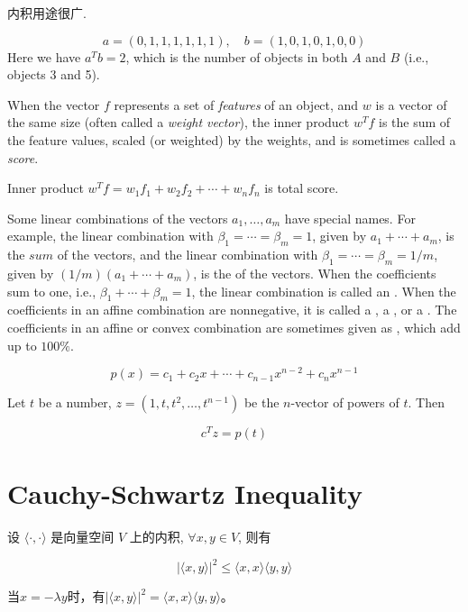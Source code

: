内积用途很广.

\begin{example}[计算同时出现的项目数]
   $$
a=(0,1,1,1,1,1,1), \quad b=(1,0,1,0,1,0,0)
$$
Here we have $ a^{T} b=2 $, which is the number of objects in both $ A $ and $ B $ (i.e., objects 3 and 5). 
\end{example}

\begin{example}
    When the vector $f$ represents a set of \textit{features} of
    an object, and $w$ is a vector of the same size (often called a \textit{weight vector}), the
    inner product $w^T f$ is the sum of the feature values, scaled (or weighted) by
    the weights, and is sometimes called a \textit{score}.

    Inner product $ w^{T} f=w_{1} f_{1}+w_{2} f_{2}+\cdots+w_{n} f_{n} $ is total score. 

    Some linear combinations of the vectors $ a_{1}, \ldots, a_{m} $ have special names. For example, the linear combination with $ \beta_{1}=\cdots=\beta_{m}=1 $, given by $ a_{1}+\cdots+a_{m} $, is the $ s u m $ of the vectors, and the linear combination with $ \beta_{1}=\cdots=\beta_{m}=1 / m $, given by $ (1 / m)\left(a_{1}+\cdots+a_{m}\right) $, is the  of the vectors. When the coefficients sum to one, i.e., $ \beta_{1}+\cdots+\beta_{m}=1 $, the linear combination is called an . When the coefficients in an affine combination are nonnegative, it is called a , a , or a . The coefficients in an affine or convex combination are sometimes given as , which add up to $ 100 \% $.
\end{example}

\begin{example}[多项式]
    $$ p(x)=c_{1}+c_{2} x+\cdots+c_{n-1} x^{n-2}+c_{n} x^{n-1} $$

    Let $t$ be a number, $ z=\left(1, t, t^{2}, \ldots, t^{n-1}\right) $  be the $n$-vector of powers
    of $t$. Then

    $$ c^{T} z=p(t) $$
\end{example}


\section{Cauchy-Schwartz Inequality}
\begin{theorem}
    \label{thm:cauchy-schwartz=inequality}
    设 \( \langle \cdot,\cdot \rangle \) 是向量空间 \( V \) 上的内积, \( \forall x, y \in V \), 则有

    $$
|\langle x, y\rangle|^{2} \leq\langle x, x\rangle\langle y, y\rangle
$$

    当$x=-\lambda y$时，有$|\langle x, y\rangle|^{2}=\langle x, x\rangle\langle y, y\rangle$。
\end{theorem}

